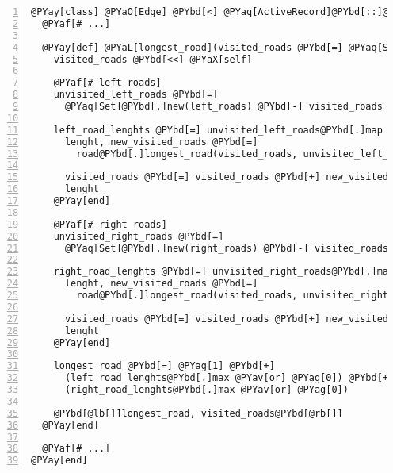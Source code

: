 \begin{Verbatim}[commandchars=@\[\],numbers=left,firstnumber=1,stepnumber=1]
@PYay[class] @PYaO[Edge] @PYbd[<] @PYaq[ActiveRecord]@PYbd[::]@PYaq[Base]
  @PYaf[# ...]

  @PYay[def] @PYaL[longest_road](visited_roads @PYbd[=] @PYaq[Set]@PYbd[.]new, skip_roads @PYbd[=] @PYaq[Set]@PYbd[.]new)
    visited_roads @PYbd[<<] @PYaX[self]

    @PYaf[# left roads]
    unvisited_left_roads @PYbd[=]
      @PYaq[Set]@PYbd[.]new(left_roads) @PYbd[-] visited_roads @PYbd[-] skip_roads

    left_road_lenghts @PYbd[=] unvisited_left_roads@PYbd[.]map @PYay[do] @PYbd[|]road@PYbd[|]
      lenght, new_visited_roads @PYbd[=]
        road@PYbd[.]longest_road(visited_roads, unvisited_left_roads)

      visited_roads @PYbd[=] visited_roads @PYbd[+] new_visited_roads
      lenght
    @PYay[end]

    @PYaf[# right roads]
    unvisited_right_roads @PYbd[=]
      @PYaq[Set]@PYbd[.]new(right_roads) @PYbd[-] visited_roads @PYbd[-] skip_roads

    right_road_lenghts @PYbd[=] unvisited_right_roads@PYbd[.]map @PYay[do] @PYbd[|]road@PYbd[|]
      lenght, new_visited_roads @PYbd[=]
        road@PYbd[.]longest_road(visited_roads, unvisited_right_roads)

      visited_roads @PYbd[=] visited_roads @PYbd[+] new_visited_roads
      lenght
    @PYay[end]

    longest_road @PYbd[=] @PYag[1] @PYbd[+]
      (left_road_lenghts@PYbd[.]max @PYav[or] @PYag[0]) @PYbd[+]
      (right_road_lenghts@PYbd[.]max @PYav[or] @PYag[0])

    @PYbd[@lb[]]longest_road, visited_roads@PYbd[@rb[]]
  @PYay[end]

  @PYaf[# ...]
@PYay[end]
\end{Verbatim}

